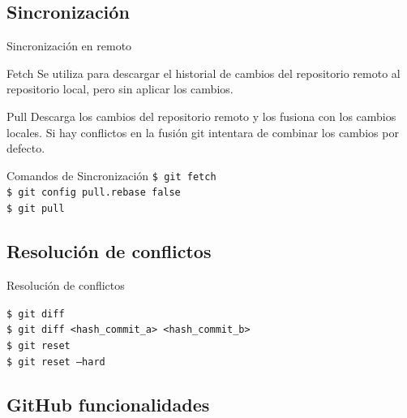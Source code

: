 \documentclass{beamer}
\begin{document}
\subsection {Sincronización}
  \begin{frame} {\LARGE Sincronización en remoto}
  
      \begin{exampleblock}{Fetch}
        Se utiliza para descargar el historial de cambios del repositorio remoto al repositorio local, pero sin aplicar los cambios.
      \end{exampleblock}
        
      \begin{exampleblock}{Pull}
        Descarga los cambios del repositorio remoto y los fusiona con los cambios locales.
        Si hay conflictos en la fusión git intentara de combinar los cambios por defecto. 
      \end{exampleblock}


      \begin{block}{Comandos de Sincronización}
        {\texttt{\$ git fetch }}  \\
        {\texttt{\$ git config pull.rebase false  }}  \\
        {\texttt{\$ git pull  }}  \\
      \end{block}
    
  \end{frame}

\subsection {Resolución de conflictos} 

  \begin{frame} {Resolución de conflictos}  
    \begin{block}{}
      \texttt{\$ git diff} \\
      \texttt{\$ git diff <hash\_commit\_a> <hash\_commit\_b>}  \\
      \texttt{\$ git reset }  \\
      \texttt{\$ git reset --hard } 
    \end{block}

  
  \end{frame}


\subsection {GitHub funcionalidades}
\end{document}
